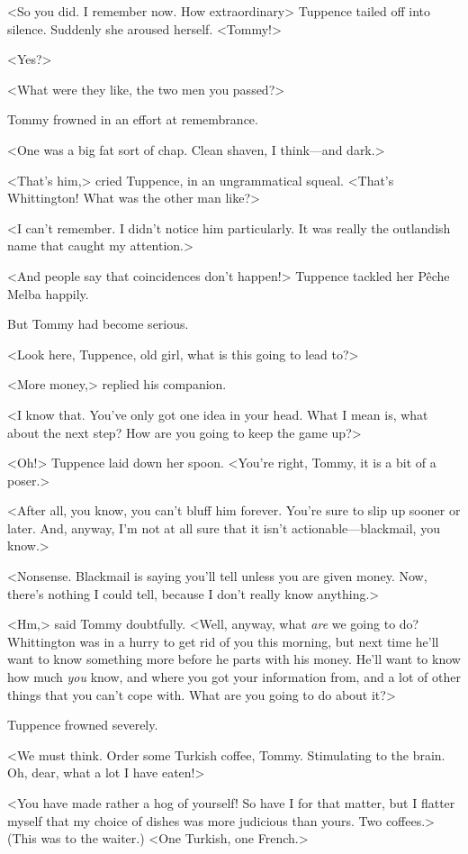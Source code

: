 <So you did. I remember now. How extraordinary\longdash> Tuppence tailed off into silence. Suddenly she aroused herself. <Tommy!>

<Yes?>

<What were they like, the two men you passed?>

Tommy frowned in an effort at remembrance.

<One was a big fat sort of chap. Clean shaven, I think—and dark.>

<That's him,> cried Tuppence, in an ungrammatical squeal. <That's Whittington! What was the other man like?>

<I can't remember. I didn't notice him particularly. It was really the outlandish name that caught my attention.>

<And people say that coincidences don't happen!> Tuppence tackled her Pêche Melba happily.

But Tommy had become serious.

<Look here, Tuppence, old girl, what is this going to lead to?>

<More money,> replied his companion.

<I know that. You've only got one idea in your head. What I mean is, what about the next step? How are you going to keep the game up?>

<Oh!> Tuppence laid down her spoon. <You're right, Tommy, it is a bit of a poser.>

<After all, you know, you can't bluff him forever. You're sure to slip up sooner or later. And, anyway, I'm not at all sure that it isn't actionable—blackmail, you know.>

<Nonsense. Blackmail is saying you'll tell unless you are given money. Now, there's nothing I could tell, because I don't really know anything.>

<Hm,> said Tommy doubtfully. <Well, anyway, what \emph{are} we going to do? Whittington was in a hurry to get rid of you this morning, but next time he'll want to know something more before he parts with his money. He'll want to know how much \emph{you} know, and where you got your information from, and a lot of other things that you can't cope with. What are you going to do about it?>

Tuppence frowned severely.

<We must think. Order some Turkish coffee, Tommy. Stimulating to the brain. Oh, dear, what a lot I have eaten!>

<You have made rather a hog of yourself! So have I for that matter, but I flatter myself that my choice of dishes was more judicious than yours. Two coffees.> (This was to the waiter.) <One Turkish, one French.>

